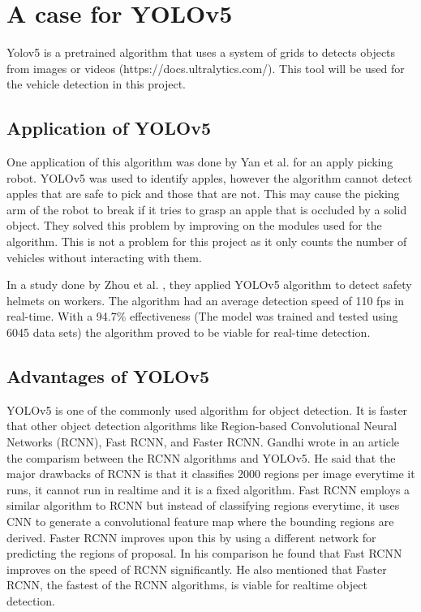 \section{A case for YOLOv5}
	Yolov5 is a pretrained algorithm that uses a system of grids to detects objects from images or videos (https://docs.ultralytics.com/). This tool will be used for the vehicle detection in this project. 

\subsection{Application of YOLOv5}
One application of this algorithm was done by Yan et al. \citeyear{yan_2021} for an apply picking robot. YOLOv5 was used to identify apples, however the algorithm cannot detect apples that are safe to pick and those that are not. This may cause the picking arm of the robot to break if it tries to grasp an apple that is occluded by a solid object. They solved this problem by improving on the modules used for the algorithm. This is not a problem for this project as it only counts the number of vehicles without interacting with them. 

In a study done by Zhou et al. \citeyear{zhou_2021}, they applied YOLOv5 algorithm to detect safety helmets on workers. The algorithm had an average detection speed of 110 fps in real-time. With a 94.7\% effectiveness (The model was trained and tested  using 6045 data sets) the algorithm proved to be viable for real-time detection.

\subsection{Advantages of YOLOv5}
	YOLOv5 is one of the commonly used algorithm for object detection. It is faster that other object detection algorithms like Region-based Convolutional Neural Networks (RCNN), Fast RCNN, and Faster RCNN. Gandhi \citeyear{gandhi_2018} wrote in an article the comparism between the RCNN algorithms and YOLOv5. He said that the major drawbacks of RCNN is that it classifies 2000 regions per image everytime it runs, it cannot run in realtime and it is a fixed algorithm. Fast RCNN employs a similar algorithm to RCNN but instead of classifying regions everytime, it uses CNN to generate a convolutional feature map where the bounding regions are derived. Faster RCNN improves upon this by using a different network for predicting the regions of proposal. In his comparison he found that Fast RCNN improves on the speed of RCNN significantly. He also mentioned that Faster RCNN, the fastest of the RCNN algorithms, is viable for realtime object detection. 

